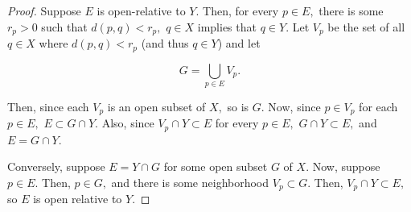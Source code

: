 \documentclass{article}
\begin{document}
\begin{proof}
Suppose $E$ is \@{open-relative} to $Y.$ Then, for every $p \in E,$ there is some $r_p > 0$ such that $d(p, q) < r_p,$ $q \in X$ implies that $q \in Y.$ Let $V_p$ be the set of all $q \in X$ where $d(p,q) < r_p$ (and thus $q \in Y$) and let

\[ G = \bigcup_{p \in E} V_p. \]

Then, since each $V_p$ is an \@{open} subset of $X,$ so is $G.$ Now, since $p \in V_p$ for each $p \in E,$ $E \subset G \cap Y.$ Also, since $V_p \cap Y \subset E$ for every $p \in E,$ $G \cap Y \subset E,$ and $E = G \cap Y.$

Conversely, suppose $E = Y \cap G$ for some open subset $G$ of $X.$ Now, suppose $p \in E.$ Then, $p \in G,$ and there is some \@{neighborhood} $V_p \subset G.$ Then, $V_p \cap Y \subset E,$ so $E$ is open relative to $Y.$
\end{proof}
\end{document}
